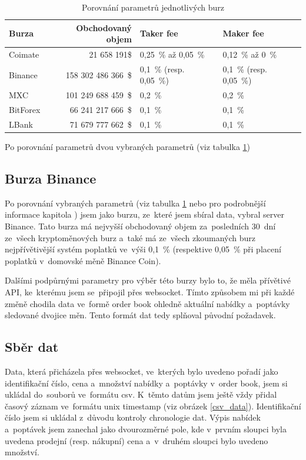 \documentclass[thesis=B,czech]{FITthesis}[2019/03/21]
\begin{document}
\begin{table}\centering
     \caption{Porovnání parametrů jednotlivých burz}
     \label{exchanges_comparison}
     \begin{tabular}{||l | r | l | l||} 
     \hline
     Burza & Obchodovaný objem & Taker fee & Maker fee \\ [0.5ex]
     \hline\hline
     Coimate & 21 658 191\$ & 0,25~\% až 0,05~\% & 0,12~\% až 0~\%  \\ 
     \hline
     Binance & 158 302 486 366~\$ & 0,1~\% (resp. 0,05~\%) & 0,1~\% (resp. 0,05~\%)  \\ 
     \hline
     MXC & 101 249 688 459~\$ & 0,2~\% & 0,2~\%  \\ 
     \hline
     BitForex & 66 241 217 666~\$ & 0,1~\% & 0,1~\%  \\ 
     \hline
     LBank & 71 679 777 662~\$ & 0,1~\% & 0,1~\%  \\ 
     \hline
    \end{tabular}
\end{table}
Po porovnání parametrů dvou vybraných parametrů (viz tabulka \ref{exchanges_comparison})

\subsection{Burza Binance}
Po porovnání vybraných parametrů (viz tabulka \ref{exchanges_comparison} nebo pro podrobnější informace kapitola ) jsem jako burzu, ze~které jsem sbíral data, vybral server Binance. Tato burza má nejvyšší obchodovaný objem za~posledních 30~dní ze~všech kryptoměnových burz \cite{coinmarketcap} a~také má ze~všech zkoumaných burz nejpřívětivější systém poplatků ve~výši 0,1~\% (respektive 0,05~\% při placení poplatků v~domovské měně Binance Coin).

Dalšími podpůrnými parametry pro výběr této burzy bylo to, že měla přívětivé API, ke~kterému jsem se~připojil přes websocket. \cite{BinanceApi} Tímto způsobem mi při každé změně chodila data ve~formě order book ohledně aktuální nabídky a~poptávky sledované dvojice měn. Tento formát dat tedy splňoval původní požadavek. \cite{BinanceApi}

\subsection{Sběr dat}
Data, která přicházela přes websocket, ve~kterých bylo uvedeno pořadí jako identifikační číslo, cena a~množství nabídky a~poptávky v~order book, jsem si ukládal do~souborů ve~formátu csv. K~těmto datům jsem ještě vždy přidal časový záznam ve~formátu unix timestamp (viz obrázek \ref{csv_data}). Identifikační číslo jsem si ukládal z~důvodu kontroly chronologie dat. Výpis nabídek a~poptávek jsem zanechal jako dvourozměrné pole, kde v~prvním sloupci byla uvedena prodejní (resp. nákupní) cena a~v~druhém sloupci bylo uvedeno množství.
\end{document}
